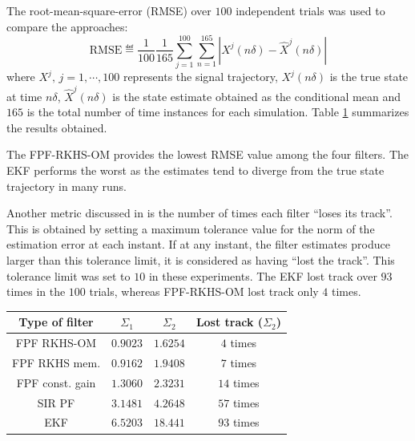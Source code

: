 The root-mean-square-error (RMSE) over $100$ independent trials was used to compare the approaches:
\[
\text{RMSE} \eqdef \frac{1}{100} \frac{1}{165} \sum_{j=1}^{100}\sum_{n=1}^{165} | X^j(n \delta) - \hat{X}^j(n \delta) |
\]
where $X^j, \, j= 1 ,\cdots, 100$ represents the signal trajectory, $X^j(n\delta)$ is the true state at time $n\delta$, $\hat{X}^j(n\delta)$ is the state estimate obtained as the conditional mean and $165$ is the total number of time instances for each simulation. Table \ref{table:rmse} summarizes the results obtained.

The FPF-RKHS-OM provides the lowest RMSE value among the four filters. The EKF performs the worst as the estimates tend to diverge from the true state trajectory in many runs.

Another metric discussed in \cite{budchelee07} is the number of times each filter ``loses its track''. This is obtained by setting a maximum tolerance value for the norm of the estimation error at each instant. If at any instant, the filter estimates produce larger than this tolerance limit, it is considered as having ``lost the track''.   This tolerance limit was set to $10$ in these experiments. The EKF lost track over $93$ times in the $100$ trials, whereas FPF-RKHS-OM lost track only $4$ times.\
\begin{table}
\begin{center}
	\begin{tabular}{ |c|c|c|c| }
		\hline
		Type of filter & $\Sigma_1$ & $\Sigma_2$ & Lost track ($\Sigma_2$) \\
		\hline
		FPF RKHS-OM & $0.9023$  &  $1.6254$ & $4$ times\\
		FPF RKHS mem. &$0.9162$ &  $ 1.9408$ & $ 7 $ times\\
		FPF const. gain & $1.3060$ & $2.3231$ & $14$ times \\
		SIR PF & $3.1481$  &  $4.2648$ &  $57$ times \\
		EKF &  $6.5203$ & $18.441$ & $93$ times \\ 		
		\hline
	\end{tabular}
	\label{table:rmse}
\end{center}
\end{table}

